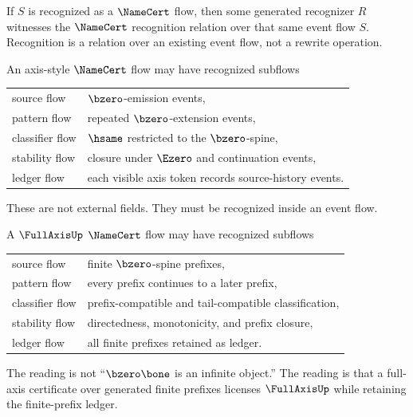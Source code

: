 \begin{corollary}
\label{cor:namecert-generated-recognition-does-not-change-source}
If $S$ is recognized as a $\NameCert$ flow, then some generated recognizer $R$ witnesses the $\NameCert$ recognition relation over that same event flow $S$. Recognition is a relation over an existing event flow, not a rewrite operation.
\end{corollary}

\begin{example}
\label{ex:namecert-generated-axis-namecert-flow}
An axis-style $\NameCert$ flow may have recognized subflows
\begin{center}
\begin{tabular}{ll}
  source flow & $\bzero$-emission events, \\
  pattern flow & repeated $\bzero$-extension events, \\
  classifier flow & $\hsame$ restricted to the $\bzero$-spine, \\
  stability flow & closure under $\Ezero$ and continuation events, \\
  ledger flow & each visible axis token records source-history events.
\end{tabular}
\end{center}
These are not external fields. They must be recognized inside an event flow.
\end{example}

\begin{example}
\label{ex:namecert-generated-fullaxis-namecert-flow}
A $\FullAxisUp$ $\NameCert$ flow may have recognized subflows
\begin{center}
\begin{tabular}{ll}
  source flow & finite $\bzero$-spine prefixes, \\
  pattern flow & every prefix continues to a later prefix, \\
  classifier flow & prefix-compatible and tail-compatible classification, \\
  stability flow & directedness, monotonicity, and prefix closure, \\
  ledger flow & all finite prefixes retained as ledger.
\end{tabular}
\end{center}
The reading is not ``$\bzero\bone$ is an infinite object.'' The reading is that a full-axis certificate over generated finite prefixes licenses $\FullAxisUp$ while retaining the finite-prefix ledger.
\end{example}

